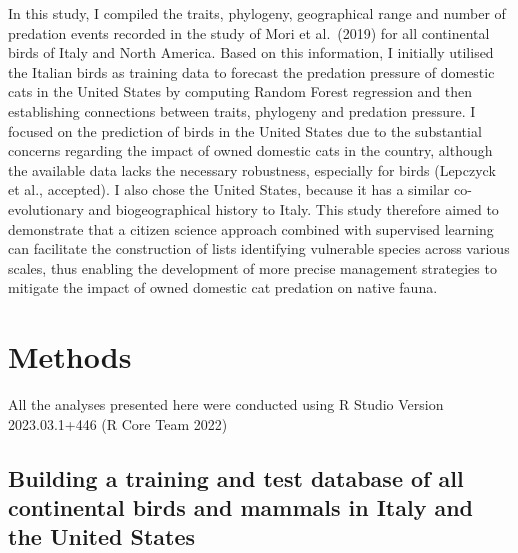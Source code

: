 \documentclass[
  super,
  review,
  3p]{elsarticle}
\begin{document}
In this study, I compiled the traits, phylogeny, geographical range and
number of predation events recorded in the study of Mori et al.~(2019)
for all continental birds of Italy and North America. Based on this
information, I initially utilised the Italian birds as training data to
forecast the predation pressure of domestic cats in the United States by
computing Random Forest regression and then establishing connections
between traits, phylogeny and predation pressure. I focused on the
prediction of birds in the United States due to the substantial concerns
regarding the impact of owned domestic cats in the country, although the
available data lacks the necessary robustness, especially for birds
(Lepczyck et al., accepted). I also chose the United States, because it
has a similar co-evolutionary and biogeographical history to Italy. This
study therefore aimed to demonstrate that a citizen science approach
combined with supervised learning can facilitate the construction of
lists identifying vulnerable species across various scales, thus
enabling the development of more precise management strategies to
mitigate the impact of owned domestic cat predation on native fauna.

\hypertarget{methods}{%
\section{\texorpdfstring{\textbf{Methods}}{Methods}}\label{methods}}

All the analyses presented here were conducted using R Studio Version
2023.03.1+446 (R Core Team 2022)

\hypertarget{building-a-training-and-test-database-of-all-continental-birds-and-mammals-in-italy-and-the-united-states}{%
\subsection{Building a training and test database of all continental
birds and mammals in Italy and the United
States}\label{building-a-training-and-test-database-of-all-continental-birds-and-mammals-in-italy-and-the-united-states}}
\end{document}
